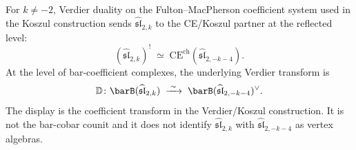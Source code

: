 \begin{theorem}
\label{thm:rosetta-feigin-frenkel}
For $k\neq -2$, Verdier duality on the Fulton--MacPherson
coefficient system used in the Koszul construction sends
$\widehat{\mathfrak{sl}}_{2,k}$ to the CE/Koszul partner at the
reflected level:
\begin{equation}\label{eq:rosetta-verdier-km-partner}
(\widehat{\mathfrak{sl}}_{2,k})^!
\;\simeq\;
\mathrm{CE}^{\mathrm{ch}}(\widehat{\mathfrak{sl}}_{2,{-k-4}}).
\end{equation}
At the level of bar-coefficient complexes, the underlying Verdier
transform is
\begin{equation}\label{eq:rosetta-verdier-km}
\mathbb{D}\colon
\barB(\widehat{\mathfrak{sl}}_{2,k})
\;\xrightarrow{\;\sim\;}\;
\barB(\widehat{\mathfrak{sl}}_{2,{-k-4}})^\vee.
\end{equation}
The display is the coefficient transform in the Verdier/Koszul
construction. It is not the bar-cobar counit and it does not
identify $\widehat{\mathfrak{sl}}_{2,k}$ with
$\widehat{\mathfrak{sl}}_{2,-k-4}$ as vertex algebras.
\end{theorem}

